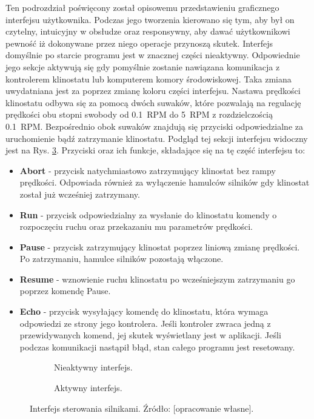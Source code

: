 Ten podrozdział poświęcony został opisowemu przedstawieniu graficznego interfejsu użytkownika. Podczas jego tworzenia kierowano się tym, aby był on czytelny, intuicyjny w obsłudze oraz responsywny, aby dawać użytkownikowi pewność iż dokonywane przez niego operacje przynoszą skutek. Interfejs domyślnie po starcie programu jest w znacznej części nieaktywny. Odpowiednie jego sekcje aktywują się gdy pomyślnie zostanie nawiązana komunikacja z kontrolerem klinostatu lub komputerem komory środowiskowej. Taka zmiana uwydatniana jest za poprzez zmianę koloru części interfejsu. Nastawa prędkości klinostatu odbywa się za pomocą dwóch suwaków, które pozwalają na regulację prędkości obu stopni swobody od \SI{0,1}{RPM} do \SI{5}{RPM} z rozdzielczością \SI{0,1}{RPM}. Bezpośrednio obok suwaków znajdują się przyciski odpowiedzialne za uruchomienie bądź zatrzymanie klinostatu. Podgląd tej sekcji interfejsu widoczny jest na Rys. \ref{fig:silniki_gui}. Przyciski oraz ich funkcje, składające się na tę część interfejsu to:
\begin{itemize}
	\item \textbf{Abort} - przycisk natychmiastowo zatrzymujący klinostat bez rampy prędkości. Odpowiada również za wyłączenie hamulców silników gdy klinostat został już wcześniej zatrzymany.
	\item \textbf{Run} - przycisk odpowiedzialny za wysłanie do klinostatu komendy o rozpoczęciu ruchu oraz przekazaniu mu parametrów prędkości.
	\item \textbf{Pause} - przycisk zatrzymujący klinostat poprzez liniową zmianę prędkości. Po zatrzymaniu, hamulce silników pozostają włączone.
	\item \textbf{Resume} - wznowienie ruchu klinostatu po wcześniejszym zatrzymaniu go poprzez komendę Pause.
	\item \textbf{Echo} - przycisk wysyłający komendę do klinostatu, która wymaga odpowiedzi ze strony jego kontrolera. Jeśli kontroler zwraca jedną z przewidywanych komend, jej skutek wyświetlany jest w aplikacji. Jeśli podczas komunikacji nastąpił błąd, stan całego programu jest resetowany.
\end{itemize}

\begin{figure}
	\centering
	
	\begin{subfigure}[h]{.49\textwidth}
		\centering
			\setlength{\fboxsep}{0pt}
		\setlength{\fboxrule}{1pt}
		\caption{Nieaktywny interfejs.}
		\label{fig:silniki_gui_nieaktywne}
	\end{subfigure}
	\hfill%
	\begin{subfigure}[h]{.49\textwidth}
		\centering
		\setlength{\fboxsep}{0pt}
		\setlength{\fboxrule}{1pt}
		\caption{Aktywny interfejs.} 
		\label{fig:silniki_gui_aktywne}
	\end{subfigure}
	
	\caption{Interfejs sterowania silnikami. Źródło: [opracowanie własne].}
	\label{fig:silniki_gui}
	
\end{figure}

